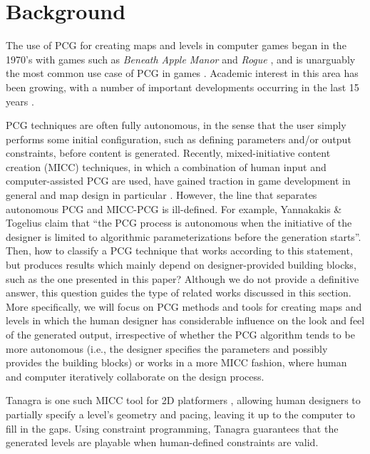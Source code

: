 \documentclass[journal]{IEEEtran}
\begin{document}
\section{Background}
\label{sec:background}

The use of PCG for creating maps and levels in computer games began in the 1970's with games
such as \textit{Beneath Apple Manor} and \textit{Rogue} \cite{aycock2016pcg}, and is unarguably the
most common use case of PCG in games \cite{yannakakis2018artificial}. Academic interest in this area
has been growing, with a number of important developments occurring in the last 15 years \cite{togelius2011search,togelius2016intro}.

PCG techniques are often fully autonomous, in the sense that the user simply performs some initial
configuration, such as defining parameters and/or output constraints, before content is generated.
Recently, mixed-initiative
content creation (MICC) techniques, in which a combination of human input and computer-assisted
PCG are used, have gained traction in game development in general and map design in particular
\cite{yannakakis2018artificial,liapis2016mixed}. However, the line that separates autonomous PCG
and MICC-PCG is ill-defined. For example, Yannakakis \& Togelius \cite{yannakakis2018artificial}
claim that ``the PCG process is autonomous when the initiative of the designer is limited to
algorithmic parameterizations before the generation starts''. Then, how to classify a PCG technique
that works according to this statement, but produces results which mainly depend on
designer-provided building blocks, such as the one presented in this paper? Although we do not
provide a definitive answer, this question guides the type of related works discussed in this
section. More specifically, we will focus on PCG methods and tools for creating maps and levels in
which the human designer has considerable influence on the look and feel of the generated output,
irrespective of whether the PCG algorithm tends to be more autonomous (i.e., the designer specifies
the parameters and possibly provides the building blocks) or works in a more MICC fashion, where
human and computer iteratively collaborate on the design process.

Tanagra is one such MICC tool for 2D platformers \cite{smith2010tanagra}, allowing human designers
to partially specify a level's geometry and pacing, leaving it up to the computer to fill in the
gaps. Using constraint programming, Tanagra guarantees that the generated levels are playable
when human-defined constraints are valid.
\end{document}
